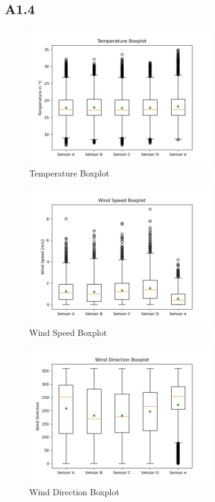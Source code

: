 \documentclass[a4paper,12pt]{article}
\begin{document}
 \subsection{A1.4}
  \begin{figure}[H] 
	\centering
	\includegraphics[width=0.7\textwidth]{Temperature Boxplot.png}
	\caption{Temperature Boxplot\cite{Maiullari2020}}
  \end{figure}
  \begin{figure}[H] 
	\centering
	\includegraphics[width=0.7\textwidth]{Wind Speed Boxplot.png}
	\caption{Wind Speed Boxplot\cite{Maiullari2020}}
  \end{figure}
  \begin{figure}[H] 
	\centering
	\includegraphics[width=0.7\textwidth]{Wind Direction Boxplot.png}
	\caption{Wind Direction Boxplot\cite{Maiullari2020}}
  \end{figure}
\pagebreak
\end{document}
